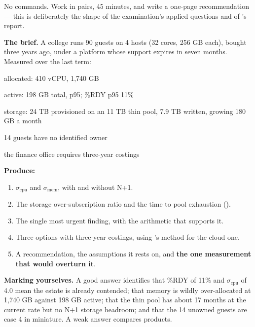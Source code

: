 \begin{lab}
No commands. Work in pairs, 45 minutes, and write a one-page recommendation ---
this is deliberately the shape of the examination's applied questions and of
's report.

\smallskip
\textbf{The brief.} A college runs 90 guests on 4 hosts (32 cores, 256 GB
each), bought three years ago, under a platform whose support expires in seven
months. Measured over the last term:

\begin{tight}
  \item allocated: 410 vCPU, 1{,}740 GB
  \item active: 198 GB total, p95; \%RDY p95 11\%
  \item storage: 24 TB provisioned on an 11 TB thin pool, 7.9 TB written,
        growing 180 GB a month
  \item 14 guests have no identified owner
  \item the finance office requires three-year costings
\end{tight}

\textbf{Produce:}
\begin{enumerate}[leftmargin=2.2em, itemsep=3pt, topsep=4pt]
  \item $\sigma_{\text{cpu}}$ and $\sigma_{\text{mem}}$, with and without N+1.
  \item The storage over-subscription ratio and the time to pool exhaustion
        ().
  \item The single most urgent finding, with the arithmetic that supports it.
  \item Three options with three-year costings, using 's method
        for the cloud one.
  \item A recommendation, the assumptions it rests on, and \textbf{the one
        measurement that would overturn it}.
\end{enumerate}

\textbf{Marking yourselves.} A good answer identifies that \%RDY of 11\% and
$\sigma_{\text{cpu}}$ of 4.0 mean the estate is already contended; that memory
is wildly over-allocated at 1{,}740 GB against 198 GB active; that the thin
pool has about 17 months at the current rate but no N+1 storage headroom; and
that the 14 unowned guests are case 4 in miniature. A weak answer compares
products.
\end{lab}

